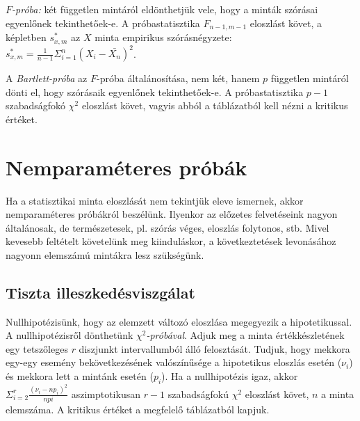 \emph{$F$-próba:} két független mintáról eldönthetjük vele, hogy a minták szórásai egyenlőnek tekinthetőek-e. A próbastatisztika $F_{n-1,m-1}$ eloszlást követ, a képletben $s^*_{x,m}$ az $X$ minta empirikus szórásnégyzete:  $s^*_{x,m} = \frac{1}{n-1} \Sigma_{i=1}^n(X_i - \bar{X_n})^2$.

A \emph{Bartlett-próba} az $F$-próba általánosítása, nem két, hanem $p$ független mintáról dönti el, hogy szórásaik egyenlőnek tekinthetőek-e. A próbastatisztika $p-1$ szabadságfokó $\chi^2$ eloszlást követ, vagyis abból a táblázatból kell nézni a kritikus értéket.

\section{Nemparaméteres próbák}

Ha a statisztikai minta eloszlását nem tekintjük eleve ismernek, akkor nemparaméteres próbákról beszélünk. Ilyenkor az előzetes felvetéseink nagyon általánosak, de természetesek, pl. szórás véges, eloszlás folytonos, stb. Mivel kevesebb feltételt követelünk meg kiinduláskor, a következtetések levonásához nagyonn elemszámú mintákra lesz szükségünk.

\subsection{Tiszta illeszkedésviszgálat}

Nullhipotézisünk, hogy az elemzett változó eloszlása megegyezik a hipotetikussal. A nullhipotézisről dönthetünk \emph{$\chi^2$-próbával}. Adjuk meg a minta értékkészletének egy tetszőleges $r$ diszjunkt intervallumból álló felosztását. Tudjuk, hogy mekkora egy-egy esemény bekövetkezésének valószínűsége a hipotetikus eloszlás esetén ($\nu_i$) és mekkora lett a mintánk esetén ($p_i$). Ha a nullhipotézis igaz, akkor $\Sigma^r_{i=2} \frac{(\nu_i - np_i)^2}{npi}$ aszimptotikusan $r-1$ szabadságfokú $\chi^2$ eloszlást követ, $n$ a minta elemszáma. A kritikus értéket a megfelelő táblázatból kapjuk.